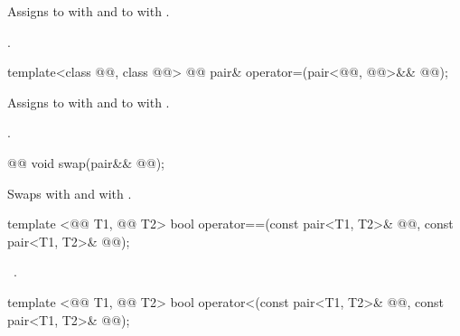 \documentclass[american,twoside]{book}
\begin{document}
\begin{itemdescr}
\pnum
\mbox{\effects}
Assigns to \mbox{} with \mbox{}
and to \mbox{} with \mbox{}.

\pnum
\mbox{\returns} \mbox{}.
\end{itemdescr}

\begin{itemdecl}
template<class @@, class @@> 
  @@
  pair& operator=(pair<@@, @@>&& @@);
\end{itemdecl}

\begin{itemdescr}
\pnum
\mbox{\effects}
Assigns to \mbox{} with \mbox{}
and to \mbox{} with \mbox{}.

\pnum
\mbox{\returns} \mbox{}.
\end{itemdescr}

\begin{itemdecl}
@@ void swap(pair&& @@);
\end{itemdecl}

\begin{itemdescr}
\pnum
\mbox{\effects} Swaps
\mbox{} with \mbox{} and
\mbox{} with \mbox{}.

\pnum
{}
\end{itemdescr}

%
\begin{itemdecl}
template <@@ T1, @@ T2>
  bool operator==(const pair<T1, T2>& @@, const pair<T1, T2>& @@);
\end{itemdecl}

\begin{itemdescr}
\pnum
\returns\ 
.
\end{itemdescr}

%
\begin{itemdecl}
template <@@ T1, @@ T2>
  bool operator<(const pair<T1, T2>& @\farg{x}@, const pair<T1, T2>& @\farg{y}@);
\end{itemdecl}
\end{document}
